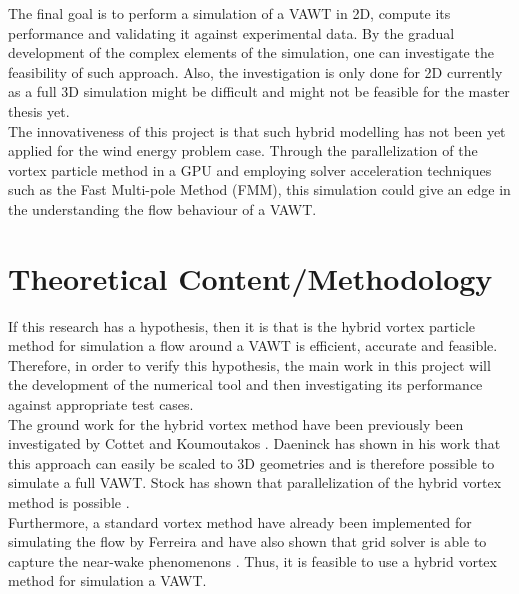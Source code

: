 The final goal is to perform a simulation of a VAWT in 2D, compute its performance and validating it against experimental data. By the gradual development of the complex elements of the simulation, one can investigate the feasibility of such approach. Also, the investigation is only done for 2D currently as a full 3D simulation might be difficult and might not be feasible for the master thesis yet.\\

The innovativeness of this project is that such hybrid modelling has not been yet applied for the wind energy problem case. Through the parallelization of the vortex particle method in a GPU and employing solver acceleration techniques such as the Fast Multi-pole Method (FMM), this simulation could give an edge in the understanding the flow behaviour of a VAWT.


\section{Theoretical Content/Methodology}
\label{sec:theory}



If this research has a hypothesis, then it is that is the hybrid vortex particle method for simulation a flow around a VAWT is efficient, accurate and feasible. Therefore, in order to verify this hypothesis, the main work in this project will the development of the numerical tool and then investigating its performance against appropriate test cases.\\

The ground work for the hybrid vortex method have been previously been investigated by Cottet and Koumoutakos \cite{Cottet2000a}. Daeninck has shown in his work that this approach can easily be scaled to 3D geometries \cite{Daeninck2006} and is therefore possible to simulate a full VAWT. Stock has shown that parallelization of the hybrid vortex method is possible \cite{Stock}.\\

Furthermore, a standard vortex method have already been implemented for simulating the flow by Ferreira \cite{Ferreira} and have also shown that grid solver is able to capture the near-wake phenomenons \cite{SimaoFerreira2008}. Thus, it is feasible to use a hybrid vortex method for simulation a VAWT.

